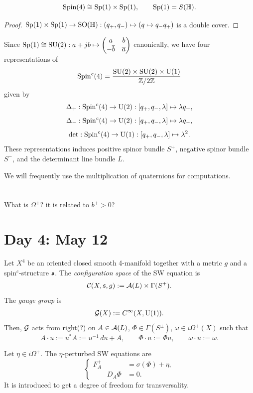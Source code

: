 \documentclass{../../../small}
\begin{document}
\begin{lemma}
\[\mathrm{Spin}(4)\cong\mathrm{Sp}(1)\times\mathrm{Sp}(1),\qquad\mathrm{Sp}(1)=S(\mathbb{H}).\]
\end{lemma}
\begin{proof}
$\mathrm{Sp}(1)\times\mathrm{Sp}(1)\to\mathrm{SO}(\mathbb{H}):(q_+,q_-)\mapsto(q\mapsto q_-q_+)$ is a double cover.
\end{proof}

Since $\mathrm{Sp}(1)\cong\mathrm{SU}(2):a+jb\mapsto\begin{pmatrix}a&b\\-\overline b&\overline a\end{pmatrix}$ canonically, we have four representations of
\[\mathrm{Spin}^c(4)=\frac{\mathrm{SU}(2)\times\mathrm{SU}(2)\times\mathrm{U}(1)}{\mathbb{Z}/2\mathbb{Z}}\]
given by
\[\Delta_+:\mathrm{Spin}^c(4)\to\mathrm{U}(2):[q_+,q_-,\lambda]\mapsto\lambda q_+,\]
\[\Delta_-:\mathrm{Spin}^c(4)\to\mathrm{U}(2):[q_+,q_-,\lambda]\mapsto\lambda q_-,\]
\[\det:\mathrm{Spin}^c(4)\to\mathrm{U}(1):[q_+,q_-,\lambda]\mapsto\lambda^2.\]
These representations induces positive spinor bundle $S^+$, negative spinor bundle $S^-$, and the determinant line bundle $L$.

We will frequently use the multiplication of quaternions for computations.




\newpage
\section{}

What is $\Omega^+$? it is related to $b^+>0$?

\newpage
\section{Day 4: May 12}


Let $X^4$ be an oriented closed smooth 4-manifold together with a metric $g$ and a spin$^c$-structure $\mathfrak{s}$.
The \emph{configuration space} of the SW equation is
\[\mathcal{C}(X,\mathfrak{s},g):=\mathcal{A}(L)\times\Gamma(S^+).\]
The \emph{gauge group} is
\[\mathcal{G}(X):=C^\infty(X,\mathrm{U}(1)).\]
Then, $\mathcal{G}$ acts from right(?) on $A\in\mathcal{A}(L)$, $\Phi\in\Gamma(S^\pm)$, $\omega\in i\Omega^+(X)$ such that
\[A\cdot u:=u^*A:=u^{-1}\,du+A,\qquad \Phi\cdot u:=\Phi u,\qquad \omega\cdot u:=\omega.\]



Let $\eta\in i\Omega^+$.
The $\eta$-perturbed SW equations are
\[\left\{\begin{aligned}
F_A^+&=\sigma(\Phi)+\eta,\\\qquad D_A\Phi&=0.
\end{aligned}\right.\]
It is introduced to get a degree of freedom for transversality.
\end{document}
